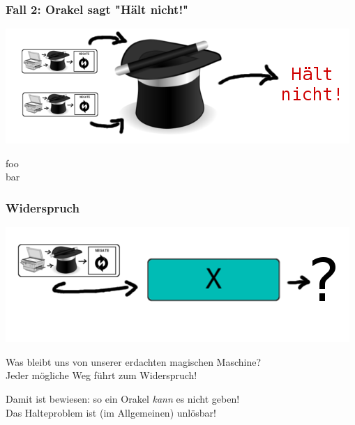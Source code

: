 \documentclass[aspectratio=43]{beamer}
\begin{document}

\begin{frame}
\frametitle{Fall 2: Orakel sagt "Hält nicht!"}

\begin{center}
\includegraphics[scale=1.4]{images/input_hat_haltsnot.png} 
\bigskip

foo\\
bar
\end{center}
\end{frame}


\begin{frame}
\frametitle{Widerspruch}
\begin{center}
\includegraphics[scale=1.4]{images/input.png} 
\bigskip

Was bleibt uns von unserer erdachten magischen Maschine?\\
Jeder mögliche Weg führt zum Widerspruch!
\pause\bigskip

Damit ist bewiesen: so ein Orakel \emph{kann} es nicht geben!\\
Das Halteproblem ist (im Allgemeinen) unlösbar!
\end{center}
\end{frame}

\end{document}
